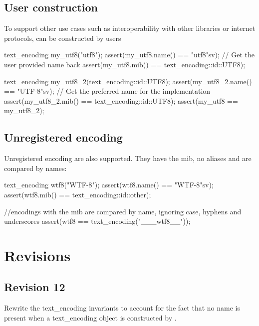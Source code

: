 \documentclass{wg21}
\begin{document}
\subsection{User construction}

To support other use cases such as interoperability with other libraries or internet protocols,
 can be constructed by users

\begin{colorblock}
text_encoding my_utf8("utf8");
assert(my_utf8.name() == "utf8"sv); // Get the user provided name back
assert(my_utf8.mib() == text_encoding::id::UTF8);

text_encoding my_utf8_2(text_encoding::id::UTF8);
assert(my_utf8_2.name() == "UTF-8"sv); // Get the preferred name for the implementation
assert(my_utf8_2.mib() == text_encoding::id::UTF8);
assert(my_utf8 == my_utf8_2);
\end{colorblock}

\subsection{Unregistered encoding}

Unregistered encoding are also supported. They have the  mib, no aliases and are compared
by names:

\begin{colorblock}
text_encoding wtf8("WTF-8");
assert(wtf8.name() == "WTF-8"sv);
assert(wtf8.mib() == text_encoding::id::other);

//encodings with the  mib are compared by name, ignoring case, hyphens and underscores
assert(wtf8 == text_encoding("___wtf8__"));
\end{colorblock}


\section{Revisions}

\subsection*{Revision 12}

Rewrite the text_encoding invariants to account for the fact that
no name is present when a text_encoding object is constructed by .
\end{document}
